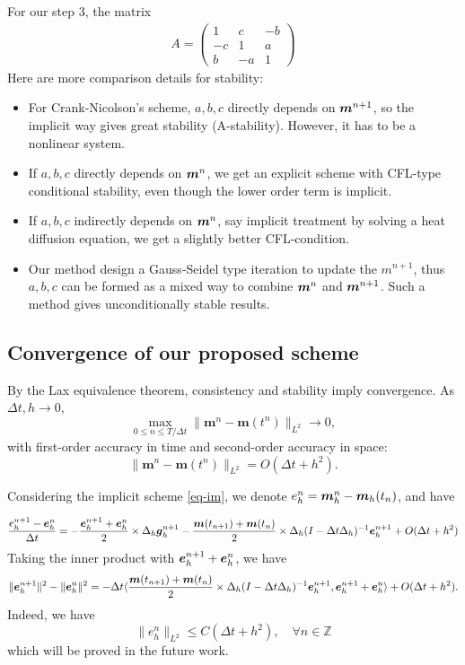 \documentclass[preprint,times,3p]{elsarticle}
\def\e{\mbox{\boldmath $e$}}
\def\g{\mbox{\boldmath $g$}}
\def\m{\mbox{\boldmath $m$}}
\begin{document}
For our step 3, the matrix 
\begin{align*}
    A=\begin{pmatrix}
        1 & c &-b\\
        -c & 1 & a\\
        b & -a & 1
    \end{pmatrix}
\end{align*}
Here are more comparison details for stability:
\begin{itemize}
    \item For Crank-Nicolson's scheme, $a, b, c$ directly depends on $\m^{n+1}$, so the implicit way gives great stability (A-stability). However, it has to be a nonlinear system.
    \item If $a,b,c$ directly depends on $\m^n$, we get an explicit scheme with CFL-type conditional stability, even though the lower order term is implicit.
    \item If $a,b,c$ indirectly depends on $\m^n$, say implicit treatment by solving a heat diffusion equation, we get a slightly better CFL-condition.
    \item Our method design a Gauss-Seidel type iteration to update the $m^{n+1}$, thus $a, b,c$ can be formed as a mixed way to combine $\m^n$ and $\m^{n+1}$. Such a method gives unconditionally stable results.
\end{itemize}

\subsection{Convergence of our proposed scheme}
By the Lax equivalence theorem, consistency and stability imply convergence. As \(\Delta t, h \to 0\),
\[
\max_{0 \leq n \leq T/\Delta t}\|\boldsymbol{m}^n - \boldsymbol{m}(t^n)\|_{L^2} \to 0,
\]
with first-order accuracy in time and second-order accuracy in space:
\[
\|\boldsymbol{m}^n - \boldsymbol{m}(t^n)\|_{L^2} = O(\Delta t + h^2).
\]

Considering the implicit scheme \cref{eq-im}, we denote $e_h^n=\m_h^n-\m_h(t_n)$, and have

\begin{align*}
    \frac{e_h^{n+1}-\e_h^n}{\Delta t}=-\frac{\e_h^{n+1}+\e_h^n}{2}\times \Delta_h \g_h^{n+1}-\frac{\m(t_{n+1})+\m(t_n)}{2}\times \Delta_h (I-\Delta t\Delta_h)^{-1}\e_h^{n+1}+O(\Delta t+h^2)
\end{align*}
Taking the inner product with $\e_h^{n+1}+\e_h^n$, we have
\begin{align*}
    \|\e_h^{n+1}\|^2-\|\e_h^n\|^2=-\Delta t \langle \frac{\m(t_{n+1})+\m(t_n)}{2}\times \Delta_h (I-\Delta t\Delta_h)^{-1}\e_h^{n+1},\e_h^{n+1}+\e_h^n \rangle +O(\Delta t+h^2).
\end{align*}
Indeed, we have
\[
\|e_h^n\|_{L^2} \leq C (\Delta t + h^2),\quad \forall n\in \mathbb{Z}
\]
which will be proved in the future work.
\end{document}
